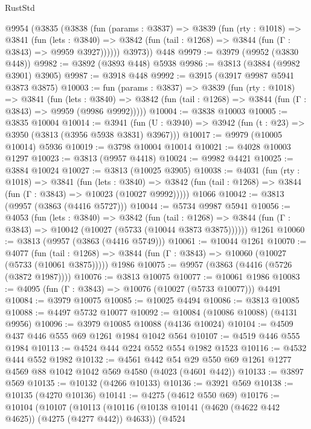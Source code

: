 \begin{lexlean}{RustStd}
\begin{coremodule}
    @9954
      (@3835
        (@3838
          (fun (params : @3837) =>
          @3839
            (fun (rty : @1018) =>
            @3841
              (fun (lets : @3840) =>
              @3842 (fun (tail : @1268) => @3844 (fun (Γ : @3843) => @9959 @3927))))))
        @3973))
    @448
@9979 := @3979 (@9952 (@3830 @448))
@9982 := @3892 (@3893 @448) @5938
@9986 := @3813 (@3884 (@9982 @3901) @3905)
@9987 := @3918 @448
@9992 := @3915 (@3917 @9987 @5941 @3873 @3875)
@10003 := fun (params : @3837) =>
  @3839
    (fun (rty : @1018) =>
    @3841
      (fun (lets : @3840) =>
      @3842 (fun (tail : @1268) => @3844 (fun (Γ : @3843) => @9959 (@9986 @9992)))))
@10004 := @3838 @10003
@10005 := @3835 @10004
@10014 := @3941
    (fun (U : @3940) => @3942 (fun (t : @23) => @3950 (@3813 (@3956 @5938 @3831) @3967)))
@10017 := @9979 (@10005 @10014) @5936
@10019 := @3798 @10004 @10014
@10021 := @4028 @10003 @1297
@10023 := @3813 (@9957 @4418)
@10024 := @9982 @4421
@10025 := @3884 @10024
@10027 := @3813 (@10025 @3905)
@10038 := @4031
    (fun (rty : @1018) =>
    @3841
      (fun (lets : @3840) =>
      @3842 (fun (tail : @1268) => @3844 (fun (Γ : @3843) => @10023 (@10027 @9992)))))
    @1066
@10042 := @3813 (@9957 (@3863 (@4416 @5727)))
@10044 := @5734 @9987 @5941
@10056 := @4053
    (fun (lets : @3840) =>
    @3842
      (fun (tail : @1268) =>
      @3844 (fun (Γ : @3843) => @10042 (@10027 (@5733 (@10044 @3873 @3875))))))
    @1261
@10060 := @3813 (@9957 (@3863 (@4416 @5749)))
@10061 := @10044 @1261
@10070 := @4077
    (fun (tail : @1268) => @3844 (fun (Γ : @3843) => @10060 (@10027 (@5733 (@10061 @3875)))))
    @1986
@10075 := @9957 (@3863 (@4416 (@5726 (@3872 @1987))))
@10076 := @3813 @10075
@10077 := @10061 @1986
@10083 := @4095 (fun (Γ : @3843) => @10076 (@10027 (@5733 @10077))) @4491
@10084 := @3979 @10075
@10085 := @10025 @4494
@10086 := @3813 @10085
@10088 := @4497 @5732 @10077
@10092 := @10084 (@10086 @10088) (@4131 @9956)
@10096 := @3979 @10085 @10088 (@4136 @10024)
@10104 := @4509 @437 @446 @555 @69 @1261 @1984 @1042 @564
@10107 := @4519 @446 @555 @1984
@10113 := @4524 @444 @224 @552 @554 @1982 @1523
@10116 := @4532 @444 @552 @1982
@10132 := @4561
    @442
    @54
    @29
    @550
    @69
    @1261
    @1277
    @4569
    @88
    @1042
    @1042
    @569
    @4580
    (@4023 (@4601 @442))
@10133 := @3897 @569
@10135 := @10132 (@4266 @10133)
@10136 := @3921 @569
@10138 := @10135 (@4270 @10136)
@10141 := @4275 (@4612 @550 @69)
@10176 := @10104
    (@10107
      (@10113
        (@10116 (@10138 @10141 (@4620 (@4622 @442 @4625)) (@4275 (@4277 @442)) @4633))
        (@4524

\end{coremodule}
\end{lexlean}
